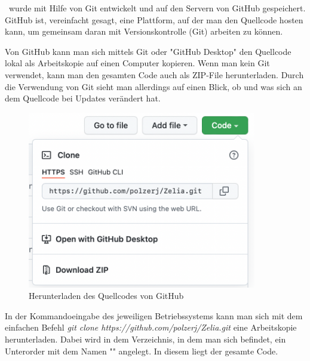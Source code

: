 
\ZELIA\ wurde mit Hilfe von Git entwickelt und auf den Servern von GitHub gespeichert. GitHub ist, vereinfacht gesagt, eine Plattform, auf der man den Quellcode hosten kann, um gemeinsam daran mit Versionskontrolle (Git) arbeiten zu können. 

Von GitHub kann man sich mittels Git oder "GitHub Desktop" den Quellcode lokal als Arbeitskopie auf einen Computer kopieren. Wenn man kein Git verwendet, kann man den gesamten Code auch als ZIP-File herunterladen. Durch die Verwendung von Git sieht man allerdings auf einen Blick, ob und was sich an dem Quellcode bei Updates verändert hat.

\begin{figure}[H]
    \centering
    \includegraphics[width=100mm]{media/Handbuch/GitHub_Download.png}
    \caption{Herunterladen des Quellcodes von GitHub}
\end{figure}


In der Kommandoeingabe des jeweiligen Betriebssystems kann man sich mit dem einfachen Befehl \emph{git clone https://github.com/polzerj/Zelia.git} eine Arbeitskopie herunterladen. Dabei wird in dem Verzeichnis, in dem man sich befindet, ein Unterorder mit dem Namen "\ZELIA" angelegt. In diesem liegt der gesamte Code.

